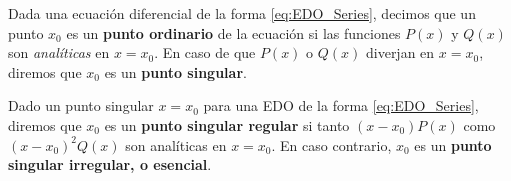 \begin{defi} 
    Dada una ecuación diferencial de la forma \eqref{eq:EDO_Series}, decimos que un punto $x_0$ es un \textbf{punto ordinario} de la ecuación si las funciones $P(x)$ y $Q(x)$ son \emph{analíticas} en $x=x_0$. En caso de que $P(x)$ o $Q(x)$ diverjan en $x = x_0$, diremos que $x_0$ es un \textbf{punto singular}. 
\end{defi}

\begin{defi} 
    Dado un punto singular $x=x_0$ para una EDO de la forma \eqref{eq:EDO_Series}, diremos que $x_0$ es un \textbf{punto singular regular} si tanto $(x-x_0)P(x)$ como $(x-x_0)^2Q(x)$ son analíticas en $x=x_0$. En caso contrario, $x_0$ es un \textbf{punto singular irregular, o esencial}.
\end{defi}

